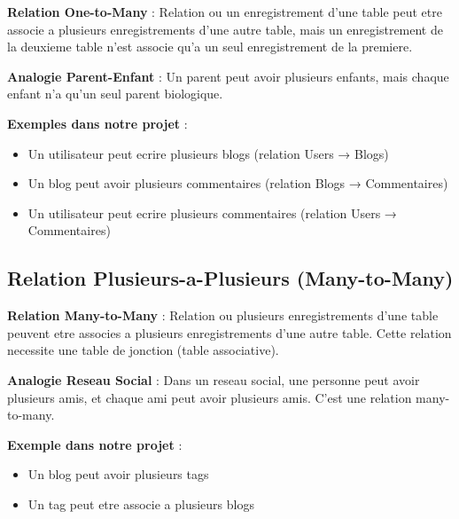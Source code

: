 \documentclass[a4paper,12pt]{book}
\begin{document}
\begin{definitionbox}
    \textbf{Relation One-to-Many} : Relation ou un enregistrement d'une table peut etre associe a plusieurs enregistrements d'une autre table, mais un enregistrement de la deuxieme table n'est associe qu'a un seul enregistrement de la premiere.
\end{definitionbox}

\begin{analogybox}
    \textbf{Analogie Parent-Enfant} : Un parent peut avoir plusieurs enfants, mais chaque enfant n'a qu'un seul parent biologique.
\end{analogybox}

\textbf{Exemples dans notre projet} :
\begin{itemize}
    \item Un utilisateur peut ecrire plusieurs blogs (relation Users → Blogs)
    \item Un blog peut avoir plusieurs commentaires (relation Blogs → Commentaires)
    \item Un utilisateur peut ecrire plusieurs commentaires (relation Users → Commentaires)
\end{itemize}

\subsection{Relation Plusieurs-a-Plusieurs (Many-to-Many)}

\begin{definitionbox}
    \textbf{Relation Many-to-Many} : Relation ou plusieurs enregistrements d'une table peuvent etre associes a plusieurs enregistrements d'une autre table. Cette relation necessite une table de jonction (table associative).
\end{definitionbox}

\begin{analogybox}
    \textbf{Analogie Reseau Social} : Dans un reseau social, une personne peut avoir plusieurs amis, et chaque ami peut avoir plusieurs amis. C'est une relation many-to-many.
\end{analogybox}

\textbf{Exemple dans notre projet} :
\begin{itemize}
    \item Un blog peut avoir plusieurs tags
    \item Un tag peut etre associe a plusieurs blogs
\end{itemize}
\end{document}
